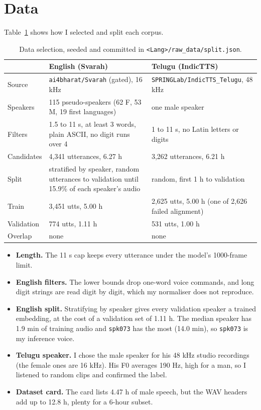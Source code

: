 \documentclass[11pt,a4paper]{article}
\newcommand{\code}[1]{\texttt{#1}}
\begin{document}
\section{Data}

Table~\ref{tab:data} shows how I selected and split each corpus.
\begin{table}[!htbp]
\centering\small
\begin{tabularx}{\textwidth}{>{\raggedright\arraybackslash}p{2.6cm}XX}
\toprule
& \textbf{English (Svarah)} & \textbf{Telugu (IndicTTS)} \\
\midrule
Source & \code{ai4bharat/Svarah} (gated), 16 kHz & \code{SPRINGLab/IndicTTS\_Telugu}, 48 kHz \\
Speakers & 115 pseudo-speakers (62 F, 53 M, 19 first languages) & one male speaker \\
Filters & 1.5 to 11 s, at least 3 words, plain ASCII, no digit runs over 4 & 1 to 11 s, no Latin letters or digits \\
Candidates & 4{,}341 utterances, 6.27 h & 3{,}262 utterances, 6.21 h \\
Split & stratified by speaker, random utterances to validation until 15.9\% of each speaker's audio & random, first 1 h to validation \\
Train & 3{,}451 utts, 5.00 h & 2{,}625 utts, 5.00 h (one of 2{,}626 failed alignment) \\
Validation & 774 utts, 1.11 h & 531 utts, 1.00 h \\
Overlap & none & none \\
\bottomrule
\end{tabularx}
\caption{Data selection, seeded and committed in \code{<Lang>/raw\_data/split.json}.}
\label{tab:data}
\end{table}

\begin{itemize}
\item \textbf{Length.} The 11 s cap keeps every utterance under the model's 1000-frame limit.
\item \textbf{English filters.} The lower bounds drop one-word voice commands, and long digit strings are read
  digit by digit, which my normaliser does not reproduce.
\item \textbf{English split.} Stratifying by speaker gives every validation speaker a trained embedding, at the cost
  of a validation set of 1.11 h. The median speaker has 1.9 min of training audio and \code{spk073} has the most
  (14.0 min), so \code{spk073} is my inference voice.
\item \textbf{Telugu speaker.} I chose the male speaker for his 48 kHz studio recordings (the female ones are
  16 kHz). His F0 averages 190 Hz, high for a man, so I listened to random clips and confirmed the label.
\item \textbf{Dataset card.} The card lists 4.47 h of male speech, but the WAV headers add up to 12.8 h, plenty
  for a 6-hour subset.
\end{itemize}
\end{document}
